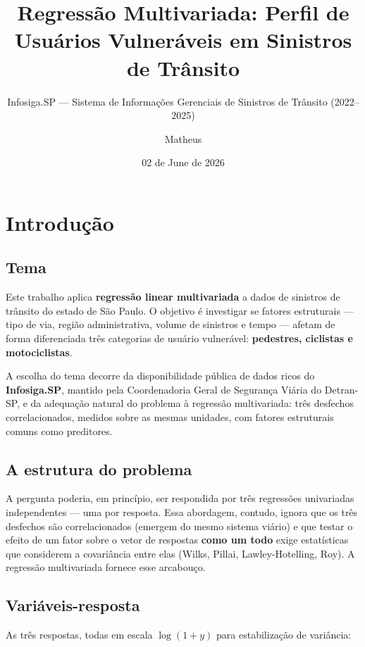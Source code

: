 \documentclass[
  11pt,
]{article}
\title{Regressão Multivariada: Perfil de Usuários Vulneráveis em
Sinistros de Trânsito}
\subtitle{Infosiga.SP --- Sistema de Informações Gerenciais de Sinistros
de Trânsito (2022--2025)}
\author{Matheus}
\date{02 de June de 2026}
\begin{document}
\maketitle

{
\setcounter{tocdepth}{2}
\tableofcontents
}
\section{Introdução}\label{introduuxe7uxe3o}

\subsection{Tema}\label{tema}

Este trabalho aplica \textbf{regressão linear multivariada} a dados de
sinistros de trânsito do estado de São Paulo. O objetivo é investigar se
fatores estruturais --- tipo de via, região administrativa, volume de
sinistros e tempo --- afetam de forma diferenciada três categorias de
usuário vulnerável: \textbf{pedestres, ciclistas e motociclistas}.

A escolha do tema decorre da disponibilidade pública de dados ricos do
\textbf{Infosiga.SP}, mantido pela Coordenadoria Geral de Segurança
Viária do Detran-SP, e da adequação natural do problema à regressão
multivariada: três desfechos correlacionados, medidos sobre as mesmas
unidades, com fatores estruturais comuns como preditores.

\subsection{A estrutura do problema}\label{a-estrutura-do-problema}

A pergunta poderia, em princípio, ser respondida por três regressões
univariadas independentes --- uma por resposta. Essa abordagem, contudo,
ignora que os três desfechos são correlacionados (emergem do mesmo
sistema viário) e que testar o efeito de um fator sobre o vetor de
respostas \textbf{como um todo} exige estatísticas que considerem a
covariância entre elas (Wilks, Pillai, Lawley-Hotelling, Roy). A
regressão multivariada fornece esse arcabouço.

\subsection{Variáveis-resposta}\label{variuxe1veis-resposta}

As três respostas, todas em escala \(\log(1+y)\) para estabilização de
variância:
\end{document}
